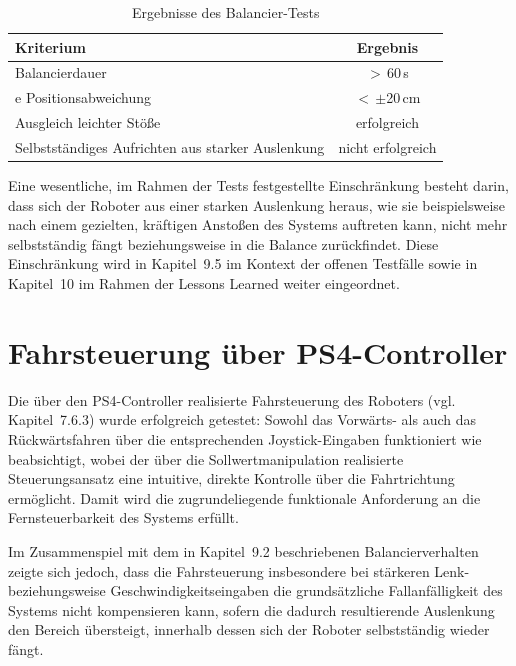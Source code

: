 \documentclass[12pt,ngerman,numbers=noenddot,abstracton,headsepline]{scrreprt}
\begin{document}
\begin{table}[h]
    \centering
    \caption{Ergebnisse des Balancier-Tests}
    \label{tab:test_balancieren}
    \begin{tabular}{|l|c|}
        \hline
        \textbf{Kriterium} & \textbf{Ergebnis} \\
        \hline
        Balancierdauer & $>$\,60\,s \\e
        \hline
        Positionsabweichung & $<$\,$\pm$20\,cm \\
        \hline
        Ausgleich leichter Stöße & erfolgreich \\
        \hline
        Selbstständiges Aufrichten aus starker Auslenkung & nicht erfolgreich \\
        \hline
    \end{tabular}
\end{table}

Eine wesentliche, im Rahmen der Tests festgestellte Einschränkung besteht darin, dass sich der Roboter aus einer starken Auslenkung heraus, wie sie beispielsweise nach einem gezielten, kräftigen Anstoßen des Systems auftreten kann, nicht mehr selbstständig fängt beziehungsweise in die Balance zurückfindet. Diese Einschränkung wird in Kapitel~9.5 im Kontext der offenen Testfälle sowie in Kapitel~10 im Rahmen der Lessons Learned weiter eingeordnet.

\section{Fahrsteuerung über PS4-Controller}
\label{sec:test_fahrsteuerung}

Die über den PS4-Controller realisierte Fahrsteuerung des Roboters (vgl. Kapitel~7.6.3) wurde erfolgreich getestet: Sowohl das Vorwärts- als auch das Rückwärtsfahren über die entsprechenden Joystick-Eingaben funktioniert wie beabsichtigt, wobei der über die Sollwertmanipulation realisierte Steuerungsansatz eine intuitive, direkte Kontrolle über die Fahrtrichtung ermöglicht. Damit wird die zugrundeliegende funktionale Anforderung an die Fernsteuerbarkeit des Systems erfüllt.

Im Zusammenspiel mit dem in Kapitel~9.2 beschriebenen Balancierverhalten zeigte sich jedoch, dass die Fahrsteuerung insbesondere bei stärkeren Lenk- beziehungsweise Geschwindigkeitseingaben die grundsätzliche Fallanfälligkeit des Systems nicht kompensieren kann, sofern die dadurch resultierende Auslenkung den Bereich übersteigt, innerhalb dessen sich der Roboter selbstständig wieder fängt.
\end{document}
